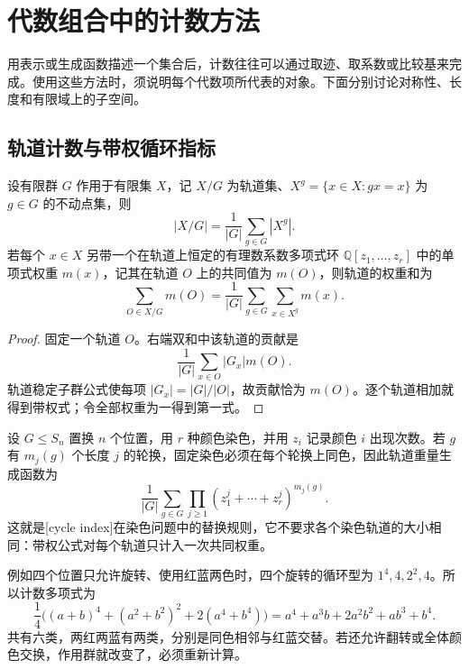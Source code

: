 %
%
\section{代数组合中的计数方法}
\label{b5:sec:A03}

用表示或生成函数描述一个集合后，计数往往可以通过取迹、取系数或比较基来完成。使用这些方法时，须说明每个代数项所代表的对象。下面分别讨论对称性、长度和有限域上的子空间。

\subsection{轨道计数与带权循环指标}
\label{b5:subsec:A03:01}

\begin{proposition}\label{b5:prop:weighted-orbit-count}
	设有限群 \(G\) 作用于有限集 \(X\)，记 \(X/G\) 为轨道集、\(X^g=\{x\in X:gx=x\}\) 为 \(g\in G\) 的不动点集，则
	\[
		|X/G|=\frac1{|G|}\sum_{g\in G}|X^g|.
	\]
	若每个 \(x\in X\) 另带一个在轨道上恒定的有理数系数多项式环 \(\mathbb Q[z_1,\ldots,z_r]\) 中的单项式权重 \(m(x)\)，记其在轨道 \(O\) 上的共同值为 \(m(O)\)，则轨道的权重和为
	\[
		\sum_{O\in X/G}m(O) =\frac1{|G|}\sum_{g\in G}\sum_{x\in X^g}m(x).
	\]
\end{proposition}
\begin{proof}
	固定一个轨道 \(O\)。右端双和中该轨道的贡献是
	\[
		\frac1{|G|}\sum_{x\in O}|G_x|m(O).
	\]
	轨道稳定子群公式使每项 \(|G_x|=|G|/|O|\)，故贡献恰为 \(m(O)\)。逐个轨道相加就得到带权式；令全部权重为一得到第一式。
\end{proof}

设 \(G\le S_n\) 置换 \(n\) 个位置，用 \(r\) 种颜色染色，并用 \(z_i\) 记录颜色 \(i\) 出现次数。若 \(g\) 有 \(m_j(g)\) 个长度 \(j\) 的轮换，固定染色必须在每个轮换上同色，因此轨道重量生成函数为
\begin{equation}\label{b5:eq:polya-cycle-index}
	\frac1{|G|}\sum_{g\in G} \prod_{j\ge1}(z_1^j+\cdots+z_r^j)^{m_j(g)}.
\end{equation}
这就是[cycle index]在染色问题中的替换规则，它不要求各个染色轨道的大小相同：带权公式对每个轨道只计入一次共同权重。

\ProseParagraphBreak
例如四个位置只允许旋转、使用红蓝两色时，四个旋转的循环型为 \(1^4,4,2^2,4\)。所以计数多项式为
\[
	\frac14\bigl((a+b)^4+(a^2+b^2)^2+2(a^4+b^4)\bigr) =a^4+a^3b+2a^2b^2+ab^3+b^4.
\]
共有六类，两红两蓝有两类，分别是同色相邻与红蓝交替。若还允许翻转或全体颜色交换，作用群就改变了，必须重新计算。

